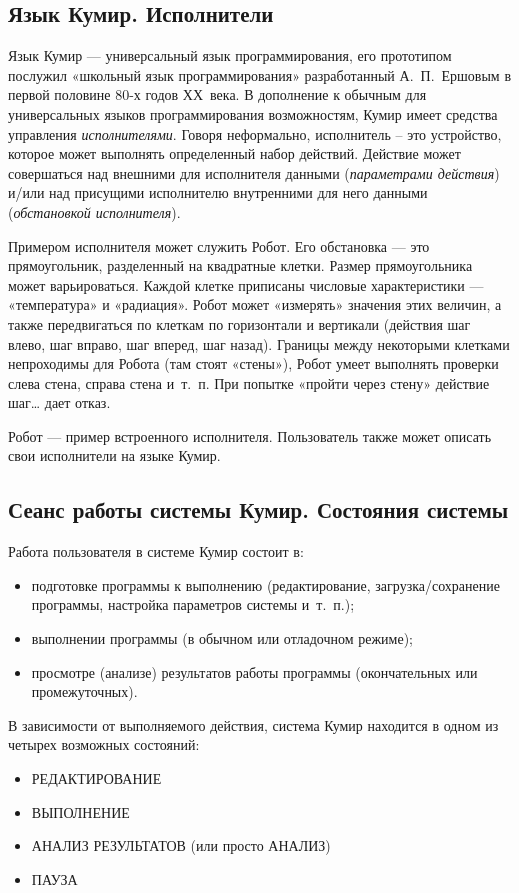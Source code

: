 \documentclass[12pt,a4paper]{article}
\begin{document}
\subsection{Язык Кумир. Исполнители}

Язык Кумир --- универсальный язык программирования, его прототипом послужил «школьный язык программирования» разработанный А.~П.~Ершовым в первой половине 80-х годов ХХ~века. В дополнение к обычным для универсальных языков программирования возможностям, Кумир имеет средства управления \emph{исполнителями}. Говоря неформально, исполнитель – это устройство, которое может выполнять определенный набор действий. Действие может совершаться над внешними для исполнителя данными (\emph{параметрами действия}) и/или над присущими исполнителю внутренними для него данными (\emph{обстановкой исполнителя}).

Примером исполнителя может служить Робот. Его обстановка --- это прямоугольник, разделенный на квадратные клетки. Размер прямоугольника может варьироваться. Каждой клетке приписаны числовые характеристики --- «температура» и «радиация». Робот может «измерять» значения этих величин, а также передвигаться по клеткам по горизонтали и вертикали (действия \textsf{шаг влево}, \textsf{шаг вправо}, \textsf{шаг вперед}, \textsf{шаг назад}). Границы между некоторыми клетками непроходимы для Робота (там стоят «стены»), Робот умеет выполнять проверки \textsf{слева стена}, \textsf{справа стена} и~т.~п. При попытке «пройти через стену» действие \textsf{шаг\dots} дает отказ.

Робот --- пример встроенного исполнителя. Пользователь также может описать свои исполнители на языке Кумир.

\subsection{Сеанс работы системы Кумир. Состояния системы}

Работа пользователя  в системе Кумир состоит в:
\begin{itemize}
\item подготовке программы к выполнению (редактирование, загрузка/сохранение программы, настройка параметров системы и~т.~п.);
\item выполнении программы (в обычном или отладочном режиме);
\item просмотре (анализе) результатов работы программы (окончательных или промежуточных).
\end{itemize}

В зависимости от выполняемого действия, система Кумир находится в одном из четырех возможных состояний:
\begin{itemize}
\item РЕДАКТИРОВАНИЕ
\item ВЫПОЛНЕНИЕ
\item АНАЛИЗ РЕЗУЛЬТАТОВ (или просто АНАЛИЗ)
\item ПАУЗА
\end{itemize}
\end{document}
